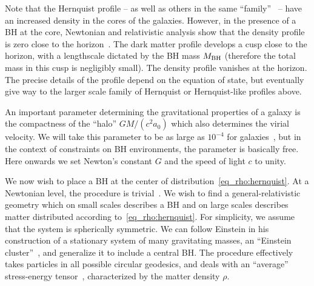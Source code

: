 \documentclass[twocolumn,preprintnumbers,nofootinbib,prd,superscriptaddress,aps]{revtex4-1}
\begin{document}
Note that the Hernquist profile -- as well as others in the same ``family''~\cite{1990ApJ...356..359H,Navarro:1995iw,1983MNRAS.202..995J,1962AJ.....67..471K} --
have an increased density in the cores of the galaxies. However, in the presence of a BH at the core, Newtonian and relativistic analysis show that the density profile
is zero close to the horizon~\cite{Gondolo:1999ef,Sadeghian:2013laa}. The dark matter profile develops a cusp close to the horizon, with a lengthscale dictated by the BH mass $M_{\rm BH}$ (therefore the total mass in this cusp is negligibly small). The density profile vanishes at the horizon. The precise details of the profile depend on the equation of state, but eventually give way to the larger scale family of Hernquist or Hernquist-like profiles above.



An important parameter determining the gravitational properties of a galaxy is the
compactness of the ``halo'' $GM/(c^2a_0)$ which also determines the virial velocity. We will take this parameter to be as large as $10^{-4}$ for galaxies~\cite{Navarro:1995iw}, but in the context of constraints on BH environments, the parameter is basically free. Here onwards we set Newton's constant $G$ and the speed of light $c$ to unity. 





We now wish to place a BH at the center of distribution~\eqref{eq_rho:hernquist}. At a Newtonian level, the procedure is trivial~\cite{1996ApJ...471...68C,2004MNRAS.351...18B}.
We wish to find a general-relativistic geometry which on small scales describes a BH and on large scales describes matter distributed according to~\eqref{eq_rho:hernquist}. For simplicity, we assume that the system is spherically symmetric. 
We can follow Einstein in his construction of a stationary system of many gravitating masses, an ``Einstein cluster''~\cite{Einstein:1939ms,Geralico:2012jt}, and generalize it to include a central BH. The procedure effectively takes particles in all possible circular geodesics, and deals with an ``average'' stress-energy tensor~\cite{Einstein:1939ms,Geralico:2012jt}, characterized by the matter density $\rho$. 
\end{document}
